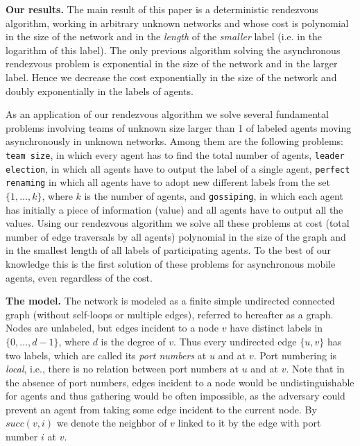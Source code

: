 \documentclass [11pt] {article}
\begin{document}
\noindent
{\bf Our results.} The main result of this paper is a deterministic rendezvous algorithm, working in arbitrary unknown networks and whose cost is polynomial in the size of the network and in the {\em length} of the {\em smaller} label (i.e. in the logarithm of this label).
The only previous algorithm solving the asynchronous rendezvous problem \cite{CLP} is exponential in the size of the network and in the larger label.
Hence we decrease the cost exponentially in the size of the network and doubly exponentially in the labels of agents.

As an application of our rendezvous algorithm we solve several fundamental problems involving teams of unknown size larger than 1 of labeled agents
moving asynchronously in unknown networks. Among them are the following problems: {\tt team size}, in which every agent has to find the total
number of agents, {\tt leader election}, in which all agents have to output the label of a single agent, {\tt perfect renaming} in which all agents
have to adopt new different labels from the set $\{1,\dots,k\}$, where $k$ is the number of agents, and {\tt gossiping}, in which each agent has initially a piece of information (value) and all agents have to output all the values. Using our rendezvous algorithm we solve all these problems at cost
(total number of edge traversals by all agents) polynomial in the size of the graph and in the smallest length of all labels of participating agents.
To the best of our knowledge this is the first solution of these problems for asynchronous mobile agents, even regardless of the cost.

 




\noindent
{\bf The model.}
The network is modeled as a finite simple undirected connected graph (without self-loops or multiple edges), referred to hereafter as a graph. 
Nodes are unlabeled, but
edges incident to a node $v$ have distinct labels in 
$\{0,\dots,d-1\}$, where $d$ is the degree of $v$. Thus every undirected
edge $\{u,v\}$ has two labels, which are called its {\em port numbers} at $u$
and at $v$. Port numbering is {\em local}, i.e., there is no relation between
port numbers at $u$ and at $v$. Note that in the absence of port numbers, edges incident to a node
would be undistinguishable for agents and thus gathering would be often impossible, 
as the adversary could prevent an agent from taking some edge incident to the current node. 
{By $succ(v,i)$ we denote the neighbor of $v$ linked to it by the edge with port number $i$ at $v$.}
\end{document}
